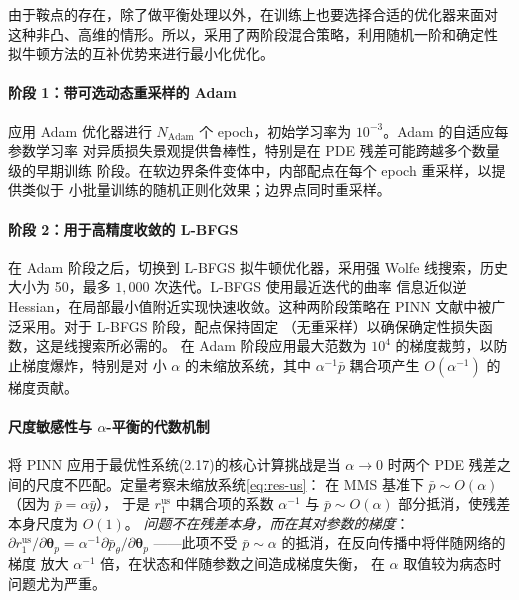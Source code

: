 \documentclass{xmu}
\theoremstyle{plain}
\theoremstyle{remark}
\begin{document}
\label{subsec:train-strategy}

由于鞍点的存在，除了做平衡处理以外，在训练上也要选择合适的优化器来面对
这种非凸、高维的情形。所以，采用了两阶段混合策略，利用随机一阶和确定性
拟牛顿方法的互补优势来进行最小化优化。

\paragraph{阶段 1：带可选动态重采样的 Adam}
应用 Adam 优化器\cite{25}进行 $N_{\mathrm{Adam}}$ 个 epoch，初始学习率为 $10^{-3}$。Adam 的自适应每参数学习率
对异质损失景观提供鲁棒性，特别是在 PDE 残差可能跨越多个数量级的早期训练
阶段。在软边界条件变体中，内部配点在每个 epoch 重采样，以提供类似于
小批量训练的随机正则化效果；边界点同时重采样。

\paragraph{阶段 2：用于高精度收敛的 L-BFGS}
在 Adam 阶段之后，切换到 L-BFGS 拟牛顿优化器\cite{26}，采用强 Wolfe
线搜索，历史大小为 50，最多 $1{,}000$ 次迭代。L-BFGS 使用最近迭代的曲率
信息近似逆 Hessian，在局部最小值附近实现快速收敛。这种两阶段策略在 PINN
文献中被广泛采用\cite{16,21}。对于 L-BFGS 阶段，配点保持固定
（无重采样）以确保确定性损失函数，这是线搜索所必需的。
在 Adam 阶段应用最大范数为 $10^4$ 的梯度裁剪，以防止梯度爆炸，特别是对
小 $\alpha$ 的未缩放系统，其中 $\alpha^{-1}\bar p$ 耦合项产生 $O(\alpha^{-1})$
的梯度贡献。

\paragraph{尺度敏感性与 $\alpha$-平衡的代数机制}
将 PINN 应用于最优性系统(2.17)的核心计算挑战是当 $\alpha\to 0$ 时两个
PDE 残差之间的尺度不匹配。定量考察未缩放系统\eqref{eq:res-us}：
在 MMS 基准下 $\bar p\sim O(\alpha)$（因为 $\bar p=\alpha\bar y$），
于是 $r_1^{\mathrm{us}}$ 中耦合项的系数 $\alpha^{-1}$ 与
$\bar p\sim O(\alpha)$ 部分抵消，使残差本身尺度为 $O(1)$。
\emph{问题不在残差本身，而在其对参数的梯度}：
$\partial r_1^{\mathrm{us}}/\partial\boldsymbol{\theta}_p
=\alpha^{-1}\partial\bar p_\theta/\partial\boldsymbol{\theta}_p$
——此项不受 $\bar p\sim\alpha$ 的抵消，在反向传播中将伴随网络的梯度
放大 $\alpha^{-1}$ 倍，在状态和伴随参数之间造成梯度失衡，
在 $\alpha$ 取值较为病态时问题尤为严重。
\end{document}
